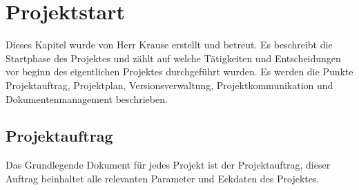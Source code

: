\chapter{Projektstart}

Dieses Kapitel wurde von Herr Krause erstellt und betreut. Es beschreibt die Startphase des Projektes und zählt auf welche Tätigkeiten und Entscheidungen vor beginn des eigentlichen Projektes durchgeführt wurden. Es werden die Punkte Projektauftrag, Projektplan, Versionsverwaltung, Projektkommunikation und Dokumentenmanagement beschrieben.

\section{Projektauftrag}

Das Grundlegende Dokument für jedes Projekt ist der Projektauftrag, dieser Auftrag beinhaltet alle relevanten Parameter und Eckdaten des Projektes.

